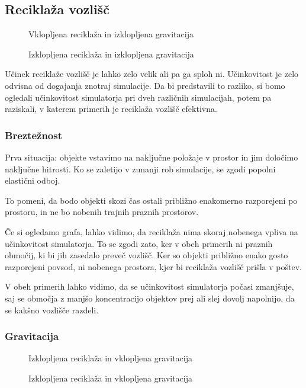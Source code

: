 \documentclass[a4paper,12pt]{article}
\begin{document}
\subsection{Reciklaža vozlišč}\label{reciklaza}
\begin{figure}
    \caption{Vklopljena reciklaža in izklopljena gravitacija}
    \vspace{0.5cm}
    \caption{Izklopljena reciklaža in izklopljena gravitacija}
\end{figure}
Učinek reciklaže vozlišč je lahko zelo velik ali pa ga sploh ni. Učinkovitost je zelo odvisna od dogajanja znotraj
simulacije. Da bi predstavili to razliko, si bomo ogledali učinkovitost simulatorja pri dveh različnih simulacijah,
potem pa raziskali, v katerem primerih je reciklaža vozlišč efektivna.
\subsubsection{Breztežnost}
Prva situacija: objekte vstavimo na naključne položaje v prostor in jim določimo naključne hitrosti. Ko 
se zaletijo v zunanji rob simulacije, se zgodi popolni elastični odboj.

To pomeni, da bodo objekti skozi čas ostali približno enakomerno razporejeni po prostoru,
in ne bo nobenih trajnih praznih prostorov.

Če si ogledamo grafa, lahko vidimo, da reciklaža nima skoraj nobenega vpliva na učinkovitost simulatorja.
To se zgodi zato, ker v obeh primerih ni praznih območij, ki bi jih zasedalo preveč vozlišč.
Ker so objekti približno enako gosto razporejeni povsod, ni nobenega prostora, kjer bi reciklaža vozlišč prišla v poštev.

V obeh primerih lahko vidimo, da se učinkovitost simulatorja počasi zmanjšuje, saj se območja
z manjšo koncentracijo objektov prej ali slej dovolj napolnijo, da se kakšno vozlišče razdeli.

\clearpage

\subsubsection{Gravitacija}

\begin{figure}
    \caption{Izklopljena reciklaža in vklopljena gravitacija}%
    \label{fig:recycling_no_grav}
    \vspace{0.5cm}
    \caption{Izklopljena reciklaža in vklopljena gravitacija}%
    \label{fig:recycling_yes_grav}
\end{figure}
\end{document}
